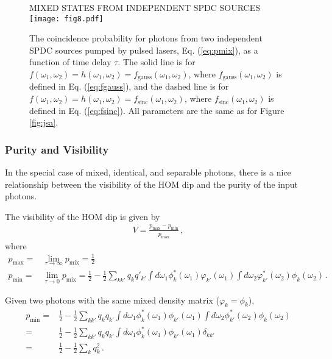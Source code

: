 \documentclass[12pt]{article}
\begin{document}
\begin{figure}[h]
\begin{center}
MIXED STATES FROM INDEPENDENT SPDC SOURCES\\
\texttt{[image: fig8.pdf]}
\caption{The coincidence probability for photons from two independent SPDC sources pumped by pulsed lasers, Eq. (\ref{eq:pmix}), as a function of time delay $\tau$. The solid line is for $f(\omega_1,\omega_2)=h(\omega_1,\omega_2)=f_{\mathrm{gauss}}(\omega_1,\omega_2)$, where $f_{\mathrm{gauss}}(\omega_1,\omega_2)$ is defined in Eq.  (\ref{eq:fgauss}), and the dashed line is for $f(\omega_1,\omega_2)=h(\omega_1,\omega_2)=f_{\mathrm{sinc}}(\omega_1,\omega_2)$, where  $f_{\mathrm{sinc}}(\omega_1,\omega_2)$ is defined in Eq.  (\ref{eq:fsinc}). All parameters are the same as for Figure \ref{fig:jsa}.}
\label{fig:mix}
\end{center}
\end{figure}

\subsubsection{Purity and Visibility}

In the special case of mixed, identical, and separable photons, there is a nice relationship between the visibility of the HOM dip and the purity of the input photons. 

The visibility of the HOM dip is given by
\begin{align}
V=\frac{p_{\mathrm{max}}-p_{\mathrm{min}}}{p_{\mathrm{max}}}\,,
\end{align}
where
\begin{align}
p_{\mathrm{max}}={}&\lim_{\tau\rightarrow\infty}p_{\mathrm{mix}}=\frac{1}{2}\\
p_{\mathrm{min}}={}&\lim_{\tau\rightarrow0}p_{\mathrm{mix}}=\frac{1}{2}-\frac{1}{2}\sum_{kk'}q_{k}q'_{k'}\int d\omega_{1}\phi_{k}^*(\omega_{1})\varphi_{k'}(\omega_{1})\int d\omega_{2}\varphi_{k'}^*(\omega_{2}) \phi_{k}(\omega_{2}) \,.
\end{align}

Given two photons with the same mixed density matrix ($\varphi_{k}=\phi_k$), 
\begin{align}
p_{\mathrm{min}}={}&\frac{1}{2}-\frac{1}{2}\sum_{kk'}q_{k}q_{k'}\int d\omega_{1}\phi_{k}^*(\omega_{1})\phi_{k'}(\omega_{1})\int d\omega_{2}\phi_{k'}^*(\omega_{2}) \phi_{k}(\omega_{2})\\
={}&\frac{1}{2}-\frac{1}{2}\sum_{kk'}q_{k}q_{k'}\int d\omega_{1}\phi_{k}^*(\omega_{1})\phi_{k'}(\omega_{1})\delta_{kk'}\\
={}&\frac{1}{2}-\frac{1}{2}\sum_{k}q^2_{k}\,.
\end{align}
\end{document}
